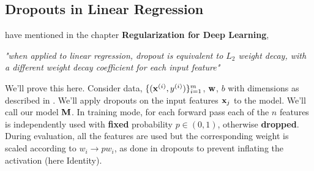 \subsection{Dropouts in Linear Regression}
\cite{Goodfellow-et-al-2016} have mentioned in the chapter \textbf{Regularization for Deep Learning}, 

\begin{center}
    \textit{"when applied to linear regression, dropout is equivalent to $L_2$ weight decay, with a different weight decay coefficient for each input feature"}
\end{center}

We'll prove this here. Consider data, $\{(\mathbf{x}^{(i)}, y^{(i)})\}_{i = 1}^m$, $\mathbf{w}$, $b$ with dimensions as described in . We'll apply dropouts on the input features $\mathbf{x}_j$ to the model. We'll call our model $\mathbf{M}$. In training mode, for each forward pass each of the $n$ features is independently used with \textbf{fixed} probability $p \in (0, 1)$, otherwise \textbf{dropped}. During evaluation, all the features are used but the corresponding weight is scaled according to $w_i \to p w_i$, as done in dropouts to prevent inflating the activation (here Identity).


